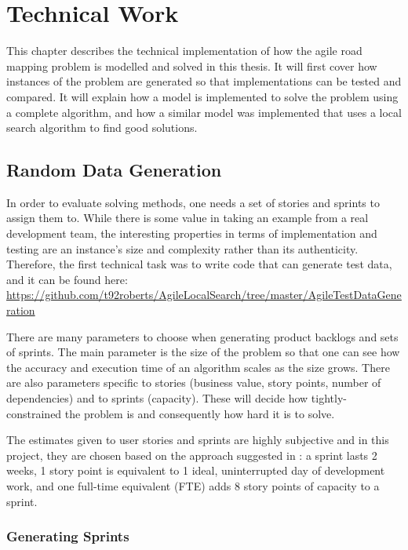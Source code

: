 \chapter{Technical Work}
\label{ChapterTechnicalWork}

This chapter describes the technical implementation of how the agile road mapping problem is modelled and solved in this thesis. It will first cover how instances of the problem are generated so that implementations can be tested and compared. It will explain how a model is implemented to solve the problem using a complete algorithm, and how a similar model was implemented that uses a local search algorithm to find good solutions.

\section{Random Data Generation}
\label{random_data_generation}

In order to evaluate solving methods, one needs a set of stories and sprints to assign them to. While there is some value in taking an example from a real development team, the interesting properties in terms of implementation and testing are an instance's size and complexity rather than its authenticity. Therefore, the first technical task was to write code that can generate test data, and it can be found here: \url{https://github.com/t92roberts/AgileLocalSearch/tree/master/AgileTestDataGeneration}

There are many parameters to choose when generating product backlogs and sets of sprints. The main parameter is the size of the problem so that one can see how the accuracy and execution time of an algorithm scales as the size grows. There are also parameters specific to stories (business value, story points, number of dependencies) and to sprints (capacity). These will decide how tightly-constrained the problem is and consequently how hard it is to solve.

The estimates given to user stories and sprints are highly subjective and in this project, they are chosen based on the approach suggested in \citet{cohn2004user}: a sprint lasts 2 weeks, 1 story point is equivalent to 1 ideal, uninterrupted day of development work, and one full-time equivalent (FTE) adds 8 story points of capacity to a sprint.

\subsection{Generating Sprints}
